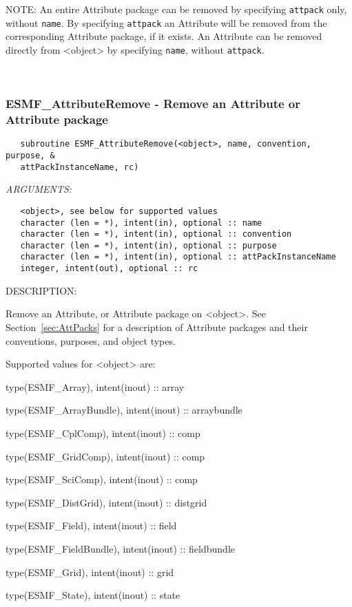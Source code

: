    NOTE: An entire Attribute package can be removed by specifying
   {\tt attpack} only, without {\tt name}. By specifying
   {\tt attpack} an Attribute will be removed
   from the corresponding Attribute package, if it exists. An
   Attribute can be removed directly from <object> by specifying
   {\tt name}, without {\tt attpack}.
  
   
 
\mbox{}\hrulefill\ 
 
\subsubsection [ESMF\_AttributeRemove] {ESMF\_AttributeRemove - Remove an Attribute or Attribute package}


  
\begin{verbatim}   subroutine ESMF_AttributeRemove(<object>, name, convention, purpose, &
   attPackInstanceName, rc)\end{verbatim}{\em ARGUMENTS:}
\begin{verbatim}   <object>, see below for supported values
   character (len = *), intent(in), optional :: name
   character (len = *), intent(in), optional :: convention
   character (len = *), intent(in), optional :: purpose
   character (len = *), intent(in), optional :: attPackInstanceName
   integer, intent(out), optional :: rc\end{verbatim}
{\sf DESCRIPTION:\\ }


   Remove an Attribute, or Attribute package on <object>.
   See Section~\ref{sec:AttPacks} for a description of Attribute packages
   and their conventions, purposes, and object types.
  
   Supported values for <object> are:
   \begin{description}
   \item type(ESMF\_Array), intent(inout) :: array
   \item type(ESMF\_ArrayBundle), intent(inout) :: arraybundle
   \item type(ESMF\_CplComp), intent(inout) :: comp
   \item type(ESMF\_GridComp), intent(inout) :: comp
   \item type(ESMF\_SciComp), intent(inout) :: comp
   \item type(ESMF\_DistGrid), intent(inout) :: distgrid
   \item type(ESMF\_Field), intent(inout) :: field
   \item type(ESMF\_FieldBundle), intent(inout) :: fieldbundle
   \item type(ESMF\_Grid), intent(inout) :: grid
   \item type(ESMF\_State), intent(inout) :: state
   \end{description}
  

